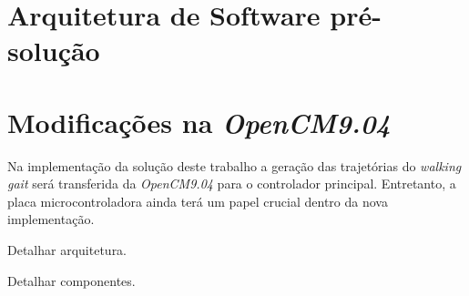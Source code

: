 \section{Arquitetura de Software pré-solução}



\section{Modificações na \textit{OpenCM9.04}}

Na implementação da solução deste trabalho a geração das trajetórias do \textit{walking gait} será transferida da \textit{OpenCM9.04} para o controlador principal. Entretanto, a placa microcontroladora ainda terá um papel crucial dentro da nova implementação.


\begin{guide}
Detalhar arquitetura.
\end{guide}

\begin{guide}
Detalhar componentes.
\end{guide}


